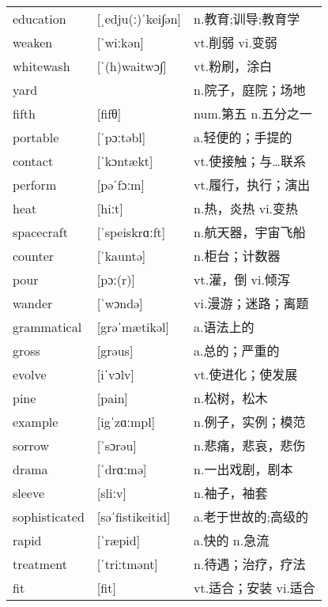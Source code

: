 \documentclass[a4paper]{article}
\begin{document}
\section{}
\begin{tabular}{l l l}

education & [ˌedju(ː)ˈkei∫ən] & n.教育;训导;教育学 \\
weaken & [ˈwiːkən] & vt.削弱 vi.变弱 \\
whitewash & [ˈ(h)waitwɔ∫] & vt.粉刷，涂白 \\
yard &  & n.院子，庭院；场地 \\
fifth & [fifθ] & num.第五 n.五分之一 \\
portable & [ˈpɔːtəbl] & a.轻便的；手提的 \\
contact & [ˈkɔntækt] & vt.使接触；与…联系 \\
perform & [pəˈfɔːm] & vt.履行，执行；演出 \\
heat & [hiːt] & n.热，炎热 vi.变热 \\
spacecraft & [ˈspeiskrɑːft] & n.航天器，宇宙飞船 \\
counter & [ˈkauntə] & n.柜台；计数器 \\
pour & [pɔː(r)] & vt.灌，倒 vi.倾泻 \\
wander & [ˈwɔndə] & vi.漫游；迷路；离题 \\
grammatical & [grəˈmætikəl] & a.语法上的 \\
gross & [grəus] & a.总的；严重的 \\
evolve & [iˈvɔlv] & vt.使进化；使发展 \\
pine & [pain] & n.松树，松木 \\
example & [igˈzɑːmpl] & n.例子，实例；模范 \\
sorrow & [ˈsɔrəu] & n.悲痛，悲哀，悲伤 \\
drama & [ˈdrɑːmə] & n.一出戏剧，剧本 \\
sleeve & [sliːv] & n.袖子，袖套 \\
sophisticated & [səˈfistikeitid] & a.老于世故的;高级的 \\
rapid & [ˈræpid] & a.快的 n.急流 \\
treatment & [ˈtriːtmənt] & n.待遇；治疗，疗法 \\
fit & [fit] & vt.适合；安装 vi.适合 \\

\end{tabular}
\end{document}
